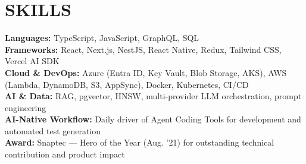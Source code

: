 \documentclass[letterpaper,10pt]{article}
\begin{document}
\section{SKILLS}
\textbf{Languages:} TypeScript, JavaScript, GraphQL, SQL \\
\textbf{Frameworks:} React, Next.js, NestJS, React Native, Redux, Tailwind CSS, Vercel AI SDK \\
\textbf{Cloud \& DevOps:} Azure (Entra ID, Key Vault, Blob Storage, AKS), AWS (Lambda, DynamoDB, S3, AppSync), Docker, Kubernetes, CI/CD \\
\textbf{AI \& Data:} RAG, pgvector, HNSW, multi-provider LLM orchestration, prompt engineering \\
\textbf{AI-Native Workflow:} Daily driver of Agent Coding Tools for development and automated test generation \\
\textbf{Award:} Snaptec --- Hero of the Year (Aug. '21) for outstanding technical contribution and product impact
\end{document}
